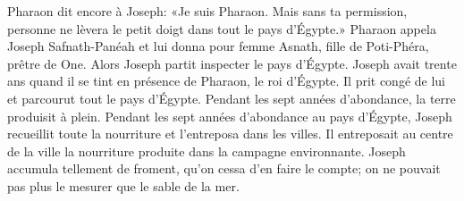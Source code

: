 Pharaon dit encore à Joseph: «Je suis Pharaon.
	Mais sans ta permission,
	personne ne lèvera le petit doigt dans tout le pays d’Égypte.»
Pharaon appela Joseph Safnath-Panéah
	et lui donna pour femme Asnath, fille de Poti-Phéra, prêtre de One.
Alors Joseph partit inspecter le pays d’Égypte.
Joseph avait trente ans quand il se tint en présence de Pharaon, le roi d’Égypte.
	Il prit congé de lui et parcourut tout le pays d’Égypte.
Pendant les sept années d’abondance, la terre produisit à plein.
Pendant les sept années d’abondance au pays d’Égypte,
	Joseph recueillit toute la nourriture et l’entreposa dans les villes.
Il entreposait au centre de la ville la nourriture produite dans la campagne environnante.
Joseph accumula tellement de froment, qu’on cessa d’en faire le compte;
	on ne pouvait pas plus le mesurer que le sable de la mer.
